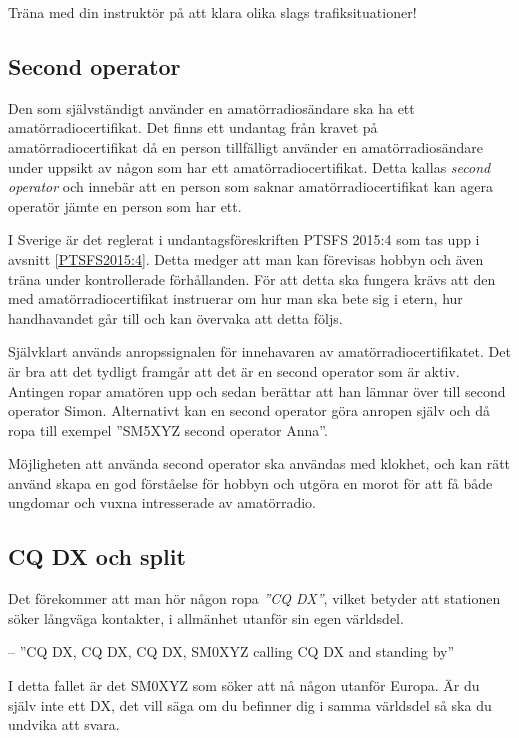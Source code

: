 Träna med din instruktör på att klara olika slags trafiksituationer!

\subsection{Second operator}
\label{secondoperator}

Den som självständigt använder en amatörradiosändare ska ha ett
amatörradiocertifikat.
Det finns ett undantag från kravet på amatörradiocertifikat då en person
tillfälligt använder en amatörradiosändare under uppsikt av någon som har ett
amatörradiocertifikat.
Detta kallas \emph{second operator} och innebär att en person som saknar
amatörradiocertifikat kan agera operatör jämte en person som har ett.

I Sverige är det reglerat i undantagsföreskriften PTSFS 2015:4 som tas upp i
avsnitt \ref{PTSFS2015:4}.
Detta medger att man kan förevisas hobbyn och även träna under kontrollerade
förhållanden.
För att detta ska fungera krävs att den med amatörradiocertifikat instruerar
om hur man ska bete sig i etern, hur handhavandet går till och kan övervaka
att detta följs.

Självklart används anropssignalen för innehavaren av amatörradiocertifikatet.
Det är bra att det tydligt framgår att det är en second operator som är aktiv.
Antingen ropar amatören upp och sedan berättar att han lämnar över till second
operator Simon.
Alternativt kan en second operator göra anropen själv och då ropa till exempel
''SM5XYZ second operator Anna''.

Möjligheten att använda second operator ska användas med klokhet, och kan rätt
använd skapa en god förståelse för hobbyn och utgöra en morot för att få både
ungdomar och vuxna intresserade av amatörradio.

\subsection{CQ DX och split}

Det förekommer att man hör någon ropa \emph{''CQ DX''}, vilket betyder att
stationen söker långväga kontakter, i allmänhet utanför sin egen världsdel.

-- ''CQ DX, CQ DX, CQ DX, SM0XYZ calling CQ DX and standing by''

I detta fallet är det SM0XYZ som söker att nå någon utanför Europa.
Är du själv inte ett DX, det vill säga om du befinner dig i samma världsdel så
ska du undvika att svara.

